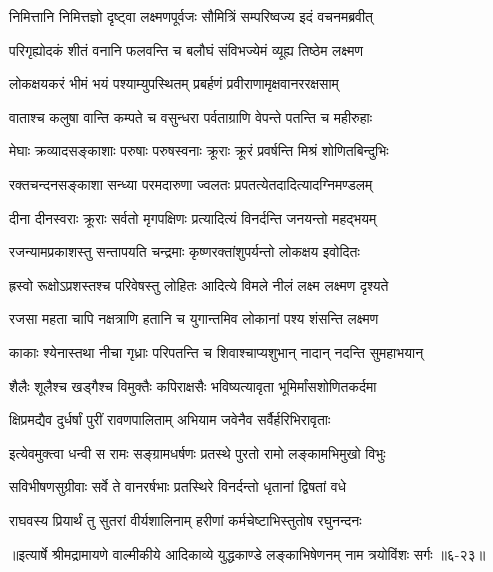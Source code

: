 
\twolineshloka
{निमित्तानि निमित्तज्ञो दृष्ट्वा लक्ष्मणपूर्वजः}
{सौमित्रिं सम्परिष्वज्य इदं वचनमब्रवीत्} %

\twolineshloka
{परिगृह्योदकं शीतं वनानि फलवन्ति च}
{बलौघं संविभज्येमं व्यूह्य तिष्ठेम लक्ष्मण} %

\twolineshloka
{लोकक्षयकरं भीमं भयं पश्याम्युपस्थितम्}
{प्रबर्हणं प्रवीराणामृक्षवानररक्षसाम्} %

\twolineshloka
{वाताश्च कलुषा वान्ति कम्पते च वसुन्धरा}
{पर्वताग्राणि वेपन्ते पतन्ति च महीरुहाः} %

\twolineshloka
{मेघाः क्रव्यादसङ्काशाः परुषाः परुषस्वनाः}
{क्रूराः क्रूरं प्रवर्षन्ति मिश्रं शोणितबिन्दुभिः} %

\twolineshloka
{रक्तचन्दनसङ्काशा सन्ध्या परमदारुणा}
{ज्वलतः प्रपतत्येतदादित्यादग्निमण्डलम्} %

\twolineshloka
{दीना दीनस्वराः क्रूराः सर्वतो मृगपक्षिणः}
{प्रत्यादित्यं विनर्दन्ति जनयन्तो महद्भयम्} %

\twolineshloka
{रजन्यामप्रकाशस्तु सन्तापयति चन्द्रमाः}
{कृष्णरक्तांशुपर्यन्तो लोकक्षय इवोदितः} %

\twolineshloka
{ह्रस्वो रूक्षोऽप्रशस्तश्च परिवेषस्तु लोहितः}
{आदित्ये विमले नीलं लक्ष्म लक्ष्मण दृश्यते} %

\twolineshloka
{रजसा महता चापि नक्षत्राणि हतानि च}
{युगान्तमिव लोकानां पश्य शंसन्ति लक्ष्मण} %

\twolineshloka
{काकाः श्येनास्तथा नीचा गृध्राः परिपतन्ति च}
{शिवाश्चाप्यशुभान् नादान् नदन्ति सुमहाभयान्} %

\twolineshloka
{शैलैः शूलैश्च खड्गैश्च विमुक्तैः कपिराक्षसैः}
{भविष्यत्यावृता भूमिर्मांसशोणितकर्दमा} %

\twolineshloka
{क्षिप्रमद्यैव दुर्धर्षां पुरीं रावणपालिताम्}
{अभियाम जवेनैव सर्वैर्हरिभिरावृताः} %

\twolineshloka
{इत्येवमुक्त्वा धन्वी स रामः सङ्ग्रामधर्षणः}
{प्रतस्थे पुरतो रामो लङ्कामभिमुखो विभुः} %

\twolineshloka
{सविभीषणसुग्रीवाः सर्वे ते वानरर्षभाः}
{प्रतस्थिरे विनर्दन्तो धृतानां द्विषतां वधे} %

\twolineshloka
{राघवस्य प्रियार्थं तु सुतरां वीर्यशालिनाम्}
{हरीणां कर्मचेष्टाभिस्तुतोष रघुनन्दनः} %


॥इत्यार्षे श्रीमद्रामायणे वाल्मीकीये आदिकाव्ये युद्धकाण्डे लङ्काभिषेणनम् नाम त्रयोविंशः सर्गः ॥६-२३॥
